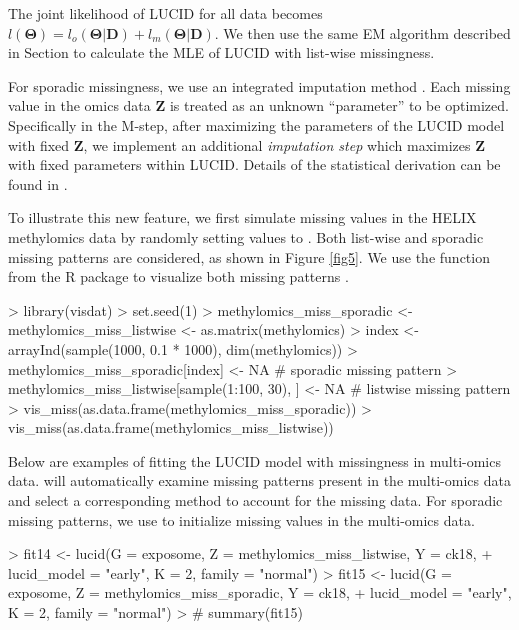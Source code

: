 The joint likelihood of LUCID for all data becomes $l(\bm{\Theta}) = l_o (\bm{\Theta}|\bm{D}) +l_m (\bm{\Theta}|\bm{D})$. We then use the same EM algorithm described in Section  to calculate the MLE of LUCID with list-wise missingness.

For sporadic missingness, we use an integrated imputation method \citep{zhang2021gaussian}. Each missing value in the omics data $\bm Z$ is treated as an unknown ``parameter'' to be optimized. Specifically in the M-step, after maximizing the parameters of the LUCID model with fixed $\bm Z$, we implement an additional \emph{imputation step} which maximizes $\bm Z$ with fixed parameters within LUCID. Details of the statistical derivation can be found in \citet{zhang2021gaussian}.

To illustrate this new feature, we first simulate missing values in the HELIX methylomics data by randomly setting values to . Both list-wise and sporadic missing patterns are considered, as shown in Figure \ref{fig5}. We use the  function from the R package  to visualize both missing patterns \citep{visdat}.

\begin{example}
> library(visdat)
> set.seed(1)
> methylomics_miss_sporadic <- methylomics_miss_listwise <- as.matrix(methylomics)
> index <- arrayInd(sample(1000, 0.1 * 1000), dim(methylomics))
> methylomics_miss_sporadic[index] <- NA # sporadic missing pattern
> methylomics_miss_listwise[sample(1:100, 30), ] <- NA # listwise missing pattern
> vis_miss(as.data.frame(methylomics_miss_sporadic))
> vis_miss(as.data.frame(methylomics_miss_listwise))
\end{example}

Below are examples of fitting the LUCID model with missingness in multi-omics data.  will automatically examine missing patterns present in the multi-omics data and select a corresponding method to account for the missing data. For sporadic missing patterns, we use  to initialize missing values in the multi-omics data.

\begin{example}
> fit14 <- lucid(G = exposome, Z = methylomics_miss_listwise, Y = ck18,
+                lucid_model = "early", K = 2, family = "normal")
> fit15 <- lucid(G = exposome, Z = methylomics_miss_sporadic, Y = ck18,
+                lucid_model = "early", K = 2, family = "normal")
> # summary(fit15)
\end{example}

